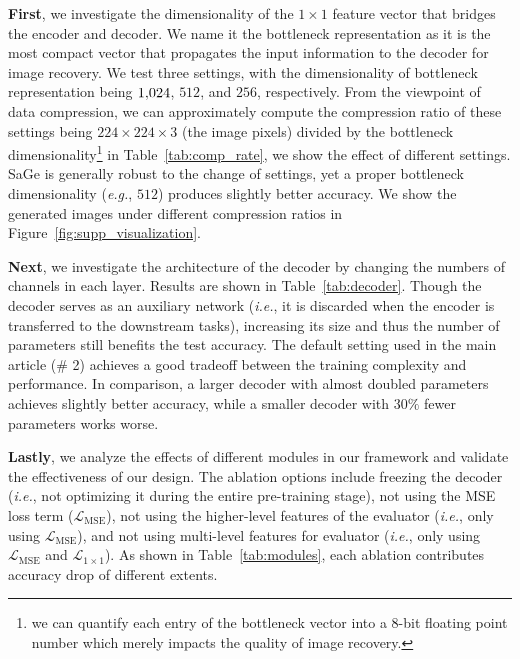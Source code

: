 \documentclass[10pt,twocolumn,letterpaper]{article}
\begin{document}
\textbf{First}, we investigate the dimensionality of the $1\times1$ feature vector that bridges the encoder and decoder. We name it the bottleneck representation as it is the most compact vector that propagates the input information to the decoder for image recovery. We test three settings, with the dimensionality of bottleneck representation being $1\rm{,}024$, $512$, and $256$, respectively. From the viewpoint of data compression, we can approximately compute the compression ratio of these settings being $224\times224\times3$ (the image pixels) divided by the bottleneck dimensionality\footnote{we can quantify each entry of the bottleneck vector into a $8$-bit floating point number which merely impacts the quality of image recovery.} in Table~\ref{tab:comp_rate}, we show the effect of different settings. SaGe is generally robust to the change of settings, yet a proper bottleneck dimensionality (\textit{e.g.}, $512$) produces slightly better accuracy. We show the generated images under different compression ratios in Figure~\ref{fig:supp_visualization}.

\textbf{Next}, we investigate the architecture of the decoder by changing the numbers of channels in each layer. Results are shown in Table~\ref{tab:decoder}. Though the decoder serves as an auxiliary network (\textit{i.e.}, it is discarded when the encoder is transferred to the downstream tasks), increasing its size and thus the number of parameters still benefits the test accuracy. The default setting used in the main article (\# 2) achieves a good tradeoff between the training complexity and performance. In comparison, a larger decoder with almost doubled parameters achieves slightly better accuracy, while a smaller decoder with $30\%$ fewer parameters works worse.

\textbf{Lastly}, we analyze the effects of different modules in our framework and validate the effectiveness of our design. The ablation options include freezing the decoder (\textit{i.e.}, not optimizing it during the entire pre-training stage), not using the MSE loss term ($\mathcal{L}_\mathrm{MSE}$), not using the higher-level features of the evaluator (\textit{i.e.}, only using $\mathcal{L}_\mathrm{MSE}$), and not using multi-level features for evaluator (\textit{i.e.}, only using $\mathcal{L}_\mathrm{MSE}$ and $\mathcal{L}_{1\times1}$). As shown in Table~\ref{tab:modules}, each ablation contributes accuracy drop of different extents.
\end{document}
